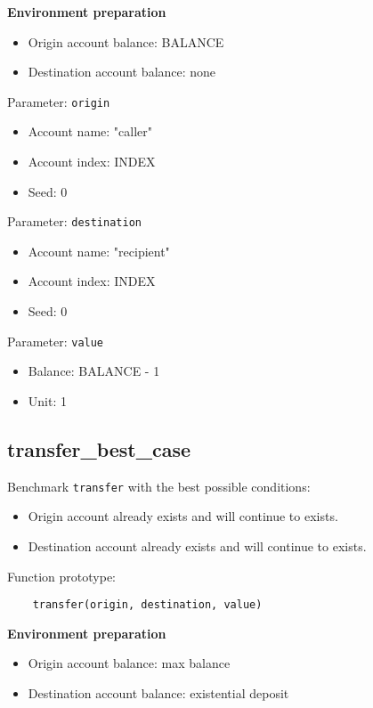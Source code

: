 \documentclass[11pt,a4paper]{article}
\begin{document}
\textbf{Environment preparation}
\begin{itemize}
\item Origin account balance: BALANCE
\item Destination account balance: none
\end{itemize}

Parameter: \verb|origin|
\begin{itemize}
\item Account name: "caller"
\item Account index: INDEX
\item Seed: 0
\end{itemize}

Parameter: \verb|destination|
\begin{itemize}
\item Account name: "recipient"
\item Account index: INDEX
\item Seed: 0
\end{itemize}

Parameter: \verb|value|
\begin{itemize}
\item Balance: BALANCE - 1
\item Unit: 1
\end{itemize}

\subsection{transfer\_best\_case}

Benchmark \verb|transfer| with the best possible conditions:
\begin{itemize}
\item Origin account already exists and will continue to exists.
\item Destination account already exists and will continue to exists.
\end{itemize}

Function prototype:

\begin{verbatim}
    transfer(origin, destination, value)
\end{verbatim}

\textbf{Environment preparation}
\begin{itemize}
\item Origin account balance: max balance
\item Destination account balance: existential deposit
\end{itemize}
\end{document}
